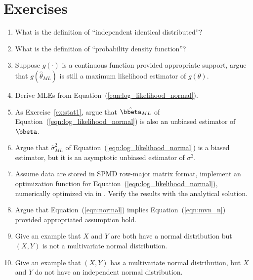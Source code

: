 \section{Exercises}
\label{sec:mle_exercise}

\begin{enumerate}[label=\thechapter-\arabic*]

\item
What is the definition of ``independent identical distributed''?

\item
What is the definition of ``probability density function''?

\item
Suppose $g(\cdot)$ is a continuous function provided appropriate support,
argue that $g\left(\hat{\theta}_{ML}\right)$ is still a maximum likelihood
estimator of $g(\theta)$.

\item
Derive MLEs from Equation~(\ref{eqn:log_likelihood_normal}).

\item
As Exercise~\ref{ex:stat1}, argue that $\hat{\bbeta}_{ML}$ of
Equation~(\ref{eqn:log_likelihood_normal}) is also
an unbiased estimator of $\bbeta$.

\item
Argue that $\hat{\sigma}^2_{ML}$ of
Equation~(\ref{eqn:log_likelihood_normal})
is a biased estimator, but it is an asymptotic
unbiased estimator of $\sigma^2$.

\item
Assume data are stored in SPMD row-major matrix format,
implement an optimization function for
Equation~(\ref{eqn:log_likelihood_normal}), numerically optimized via
 in .
Verify the results with the analytical solution.
\label{ex:likelihood1}

\item
Argue that Equation~(\ref{eqn:normal}) implies Equation~(\ref{eqn:mvn_n})
provided appropriated assumption hold.

\item
Give an example that $X$ and $Y$ are both have a normal distribution
but $(X, Y)$ is not a multivariate normal distribution.

\item
Give an example that $(X, Y)$ has a multivariate normal distribution,
but $X$ and $Y$ do not have an independent normal distribution.

\end{enumerate}

